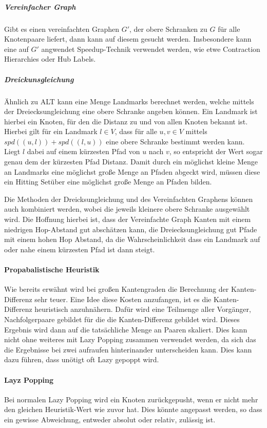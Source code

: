 \subparagraph{Vereinfacher Graph}
Gibt es einen vereinfachten Graphen $G'$, der obere Schranken zu $G$ für alle Knotenpaare liefert, dann kann auf diesem gesucht werden.
Insbesondere kann eine auf $G'$ angwendet Speedup-Technik verwendet werden, wie etwe Contraction Hierarchies oder Hub Labels.

\subparagraph{Dreickunsgleichung}
Ähnlich zu ALT\cite{goldberg2005computing} kann eine Menge Landmarks berechnet werden, welche mittels der Dreiecksungleichung eine obere Schranke angeben können.
Ein Landmark ist hierbei ein Knoten, für den die Distanz zu und von allen Knoten bekannt ist.
Hierbei gilt für ein Landmark $l \in V$, dass für alle $u, v \in V$ mittels ${spd}((u, l)) + {spd}((l, u))$ eine obere Schranke bestimmt werden kann.
Liegt $l$ dabei auf einem kürzesten Pfad von $u$ nach $v$, so entspricht der Wert sogar genau dem der kürzesten Pfad Distanz.
Damit durch ein möglichst kleine Menge an Landmarks eine möglichst große Menge an Pfaden abgeckt wird, müssen diese ein Hitting Setüber eine möglichst große Menge an Pfaden bilden.

Die Methoden der Dreicksungleichung und des Vereinfachten Graphens können auch kombiniert werden, wobei die jeweils kleinere obere Schranke ausgewählt wird.
Die Hoffnung hierbei ist, dass der Vereinfachte Graph Kanten mit einem niedrigen Hop-Abstand gut abschätzen kann, die Dreiecksungleichung gut Pfade mit einem hohen Hop Abstand, da die Wahrscheinlichkeit dass ein Landmark auf oder nahe einem kürzesten Pfad ist dann steigt.

\paragraph{Propabalistische Heuristik}
Wie bereits erwähnt wird bei großen Kantengraden die Berechnung der Kanten-Differenz sehr teuer.
Eine Idee diese Kosten anzufangen, ist es die Kanten-Differenz heuristisch anzuhnähern.
Dafür wird eine Teilmenge aller Vorgänger, Nachfolgerpaare gebildet für die die Kanten-Differenz gebildet wird.
Dieses Ergebnis wird dann auf die tatsächliche Menge an Paaren skaliert.
Dies kann nicht ohne weiteres mit Lazy Popping zusammen verwendet werden, da sich das die Ergebnisse bei zwei aufraufen hinterinander unterscheiden kann.
Dies kann dazu führen, dass unötigt oft Lazy gepoppt wird.

\paragraph{Layz Popping}
Bei normalen Lazy Popping wird ein Knoten zurückgepusht, wenn er nicht mehr den gleichen Heuristik-Wert wie zuvor hat.
Dies könnte angepasst werden, so dass ein gewisse Abweichung, entweder absolut oder relativ, zulässig ist.

